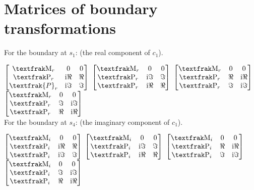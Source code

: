 \documentclass[preprint]{iucr}              %
\numberwithin{equation}{section}
\begin{document}
	\section{Matrices of boundary transformations}
	
	For the boundary at $s_1$: (the real component of $c_1$).
	
	$\begin{bmatrix}
		\Minus{}_r		& 0					& 0 \\
		\Plus{}_r		&  \textrm{i}\Re{}	& \Re{} \\
		\textfrak{P}_r	& \textrm{i}\Im{}	& \Im{}
	\end{bmatrix}$
	$\begin{bmatrix}
		\Minus{}_r	& 0 				& 0 \\
		\Plus{}_r	&\textrm{i}\Im{}	& \Im{} \\
		\Plus{}_r	& \textrm{i}\Re{}	& \Re{} \\
	\end{bmatrix}$ 
	$\begin{bmatrix}
		\label{thirdmatrix}
		\Minus{}_r	& 0			& 0 \\
		\Plus{}_r	&  \Re{}	& \textrm{i}\Re{} \\
		\Plus{}_r	& \Im{}		&\textrm{i}\Im{}
	\end{bmatrix}	$
	$\begin{bmatrix}
		\Minus{}_r	& 0			& 0 \\
		\Plus{}_r	& \Im{}		&\textrm{i}\Im{} \\
		\Plus{}_r	&  \Re{}	&\textrm{i}\Re{} \\
	\end{bmatrix}$ \\
	
	For the boundary at $s_4$: (the imaginary component of $c_1$).
	
	$\begin{bmatrix}
		\Minus{}_i	& 0					& 0 \\
		\Plus{}_i	&  \textrm{i}\Re{}	& \Re{} \\
		\Plus{}_i	& \textrm{i}\Im{}	& \Im{}
	\end{bmatrix}$
	$\begin{bmatrix}
		\Minus{}_i	& 0					& 0 \\
		\Plus{}_i	& \textrm{i}\Im{}	& \Im{} \\
		\Plus{}_i	&  \textrm{i}\Re{}	& \Re{} \\
	\end{bmatrix}$ 
	$\begin{bmatrix}
		\Minus{}_i	& 0			& 0 \\
		\Plus{}_i	&  \Re{}	& \textrm{i}\Re{} \\
		\Plus{}_i	& \Im{}		& \textrm{i}\Im{}
	\end{bmatrix}	$
	$\begin{bmatrix}
		\Minus{}_i	& 0		& 0 \\
		\Plus{}_i	& \Im{}	& \textrm{i}\Im{} \\
		\Plus{}_i	&  \Re{}& \textrm{i}\Re{} \\
	\end{bmatrix}$ \\
	
\end{document}
